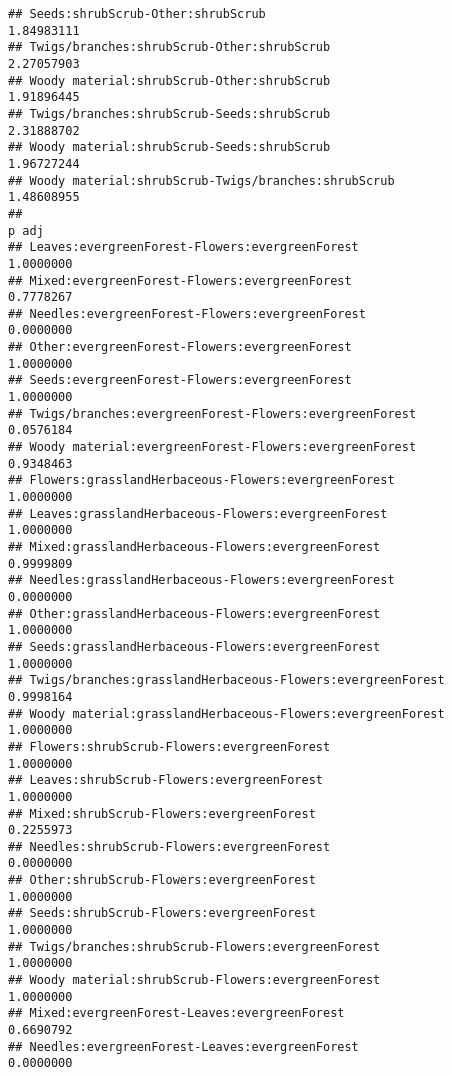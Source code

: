 \documentclass[
]{article}
\begin{document}
\begin{verbatim}
## Seeds:shrubScrub-Other:shrubScrub                                      1.84983111
## Twigs/branches:shrubScrub-Other:shrubScrub                             2.27057903
## Woody material:shrubScrub-Other:shrubScrub                             1.91896445
## Twigs/branches:shrubScrub-Seeds:shrubScrub                             2.31888702
## Woody material:shrubScrub-Seeds:shrubScrub                             1.96727244
## Woody material:shrubScrub-Twigs/branches:shrubScrub                    1.48608955
##                                                                           p adj
## Leaves:evergreenForest-Flowers:evergreenForest                        1.0000000
## Mixed:evergreenForest-Flowers:evergreenForest                         0.7778267
## Needles:evergreenForest-Flowers:evergreenForest                       0.0000000
## Other:evergreenForest-Flowers:evergreenForest                         1.0000000
## Seeds:evergreenForest-Flowers:evergreenForest                         1.0000000
## Twigs/branches:evergreenForest-Flowers:evergreenForest                0.0576184
## Woody material:evergreenForest-Flowers:evergreenForest                0.9348463
## Flowers:grasslandHerbaceous-Flowers:evergreenForest                   1.0000000
## Leaves:grasslandHerbaceous-Flowers:evergreenForest                    1.0000000
## Mixed:grasslandHerbaceous-Flowers:evergreenForest                     0.9999809
## Needles:grasslandHerbaceous-Flowers:evergreenForest                   0.0000000
## Other:grasslandHerbaceous-Flowers:evergreenForest                     1.0000000
## Seeds:grasslandHerbaceous-Flowers:evergreenForest                     1.0000000
## Twigs/branches:grasslandHerbaceous-Flowers:evergreenForest            0.9998164
## Woody material:grasslandHerbaceous-Flowers:evergreenForest            1.0000000
## Flowers:shrubScrub-Flowers:evergreenForest                            1.0000000
## Leaves:shrubScrub-Flowers:evergreenForest                             1.0000000
## Mixed:shrubScrub-Flowers:evergreenForest                              0.2255973
## Needles:shrubScrub-Flowers:evergreenForest                            0.0000000
## Other:shrubScrub-Flowers:evergreenForest                              1.0000000
## Seeds:shrubScrub-Flowers:evergreenForest                              1.0000000
## Twigs/branches:shrubScrub-Flowers:evergreenForest                     1.0000000
## Woody material:shrubScrub-Flowers:evergreenForest                     1.0000000
## Mixed:evergreenForest-Leaves:evergreenForest                          0.6690792
## Needles:evergreenForest-Leaves:evergreenForest                        0.0000000

\end{verbatim}
\end{document}
